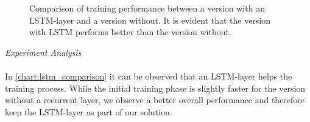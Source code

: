 \begin{figure}[H]
	\begin{center}
		
	\end{center}
	\caption{Comparison of training performance between a version with an LSTM-layer and a version without. It is evident that the version with LSTM performs better than the version without.}
	\label{chart:lstm_comparison}
\end{figure}
\textit{Experiment Analysis}\\\\
In \autoref{chart:lstm_comparison} it can be observed that an LSTM-layer helps the training process. While the initial training phase is slightly faster for the version without a recurrent layer, we observe a better overall performance and therefore keep the LSTM-layer as part of our solution.


